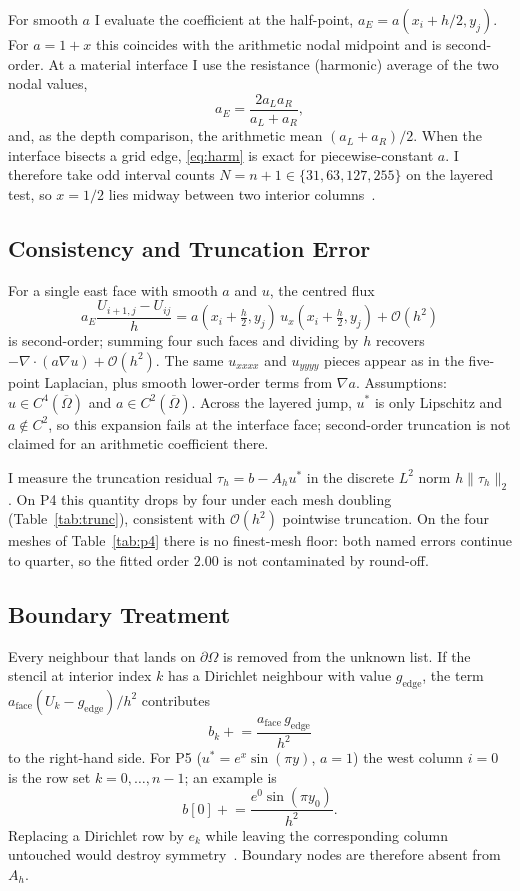\documentclass[11pt,a4paper]{article}
\begin{document}
For smooth \(a\) I evaluate the coefficient at the half-point, \(a_E=a(x_i+h/2,y_j)\).
For \(a=1+x\) this coincides with the arithmetic nodal midpoint and is second-order.
At a material interface I use the resistance (harmonic) average of the two nodal values,
\begin{equation}
a_E=\frac{2 a_L a_R}{a_L+a_R},
\label{eq:harm}
\end{equation}
and, as the depth comparison, the arithmetic mean \((a_L+a_R)/2\).
When the interface bisects a grid edge, \eqref{eq:harm} is exact for piecewise-constant \(a\).
I therefore take odd interval counts \(N=n+1\in\{31,63,127,255\}\) on the layered test, so \(x=1/2\) lies midway between two interior columns~\cite{problemPack}.

\subsection{Consistency and Truncation Error}
For a single east face with smooth \(a\) and \(u\), the centred flux
\[
a_E\frac{U_{i+1,j}-U_{ij}}{h}
=
a\!\left(x_i+\tfrac{h}{2},y_j\right)\,u_x\!\left(x_i+\tfrac{h}{2},y_j\right)
+\mathcal{O}(h^2)
\]
is second-order; summing four such faces and dividing by \(h\) recovers \(-\nabla\cdot(a\nabla u)+\mathcal{O}(h^2)\).
The same \(u_{xxxx}\) and \(u_{yyyy}\) pieces appear as in the five-point Laplacian, plus smooth lower-order terms from \(\nabla a\).
Assumptions: \(u\in C^4(\overline{\Omega})\) and \(a\in C^2(\overline{\Omega})\).
Across the layered jump, \(u^*\) is only Lipschitz and \(a\notin C^2\), so this expansion fails at the interface face; second-order truncation is not claimed for an arithmetic coefficient there.

I measure the truncation residual \(\tau_h=b-A_h u^*\) in the discrete \(L^2\) norm \(h\|\tau_h\|_2\).
On P4 this quantity drops by four under each mesh doubling (Table~\ref{tab:trunc}), consistent with \(\mathcal{O}(h^2)\) pointwise truncation.
On the four meshes of Table~\ref{tab:p4} there is no finest-mesh floor: both named errors continue to quarter, so the fitted order \(2.00\) is not contaminated by round-off.

\subsection{Boundary Treatment}
Every neighbour that lands on \(\partial\Omega\) is removed from the unknown list.
If the stencil at interior index \(k\) has a Dirichlet neighbour with value \(g_{\mathrm{edge}}\), the term \(a_{\mathrm{face}}(U_k-g_{\mathrm{edge}})/h^2\) contributes
\begin{equation}
b_k \mathrel{+}= \frac{a_{\mathrm{face}}\,g_{\mathrm{edge}}}{h^2}
\label{eq:dirichlet}
\end{equation}
to the right-hand side.
For P5 (\(u^*=e^x\sin(\pi y)\), \(a=1\)) the west column \(i=0\) is the row set \(k=0,\ldots,n-1\); an example is
\[
b[0]\mathrel{+}=\frac{e^{0}\sin(\pi y_0)}{h^2}.
\]
Replacing a Dirichlet row by \(e_k\) while leaving the corresponding column untouched would destroy symmetry~\cite{problemPack}.
Boundary nodes are therefore absent from \(A_h\).
\end{document}
